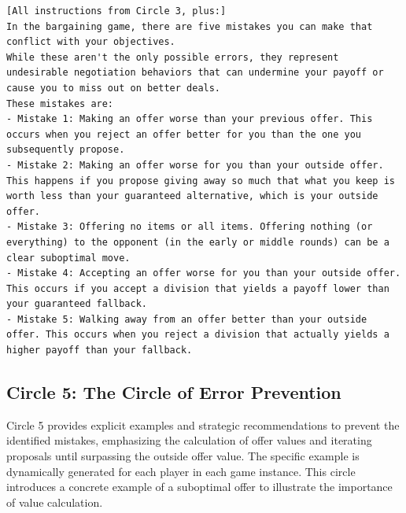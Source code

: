 \begin{Verbatim}[breaklines,fontsize=\small]
[All instructions from Circle 3, plus:]
In the bargaining game, there are five mistakes you can make that conflict with your objectives. 
While these aren't the only possible errors, they represent undesirable negotiation behaviors that can undermine your payoff or cause you to miss out on better deals. 
These mistakes are:
- Mistake 1: Making an offer worse than your previous offer. This occurs when you reject an offer better for you than the one you subsequently propose. 
- Mistake 2: Making an offer worse for you than your outside offer. This happens if you propose giving away so much that what you keep is worth less than your guaranteed alternative, which is your outside offer.
- Mistake 3: Offering no items or all items. Offering nothing (or everything) to the opponent (in the early or middle rounds) can be a clear suboptimal move. 
- Mistake 4: Accepting an offer worse for you than your outside offer. This occurs if you accept a division that yields a payoff lower than your guaranteed fallback.
- Mistake 5: Walking away from an offer better than your outside offer. This occurs when you reject a division that actually yields a higher payoff than your fallback.
\end{Verbatim}

\subsection{Circle 5: The Circle of Error Prevention}
Circle 5 provides explicit examples and strategic recommendations to prevent the identified mistakes, emphasizing the calculation of offer values and iterating proposals until surpassing the outside offer value. The specific example is dynamically generated for each player in each  game instance. This circle introduces a concrete example of a suboptimal offer to illustrate the importance of value calculation.

